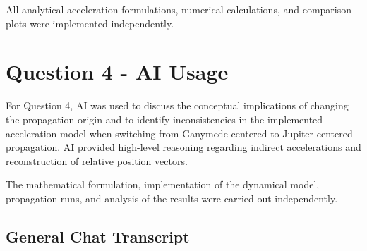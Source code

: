 \documentclass[a4paper,12pt]{article}
\begin{document}
All analytical acceleration formulations, numerical calculations, and comparison plots were implemented independently.

\section*{Question 4 - AI Usage}

For Question 4, AI was used to discuss the conceptual implications of changing the propagation origin and to identify inconsistencies in the implemented acceleration model when switching from Ganymede-centered to Jupiter-centered propagation. AI provided high-level reasoning regarding indirect accelerations and reconstruction of relative position vectors.

The mathematical formulation, implementation of the dynamical model, propagation runs, and analysis of the results were carried out independently.

\subsection*{General Chat Transcript}


\end{document}
